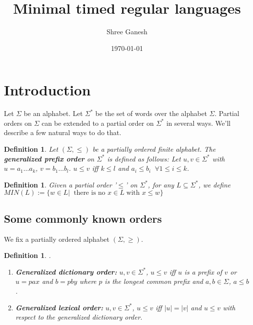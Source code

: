 \documentclass[a4paper,12pt]{article}
\title{Minimal timed regular languages}
\author{Shree Ganesh}
\date{\today}
\theoremstyle{break}
\newtheorem{definition}[theorem]{Definition}
\begin{document}
\maketitle
\titlepage
\newpage

\tableofcontents
\newpage

\section{Introduction}

Let $\Sigma$ be an alphabet. Let $\Sigma^*$ be the set of words over the alphabet $\Sigma$.
Partial orders on $\Sigma$ can be extended to a partial order on $\Sigma^*$ in several ways.
We'll describe a few natural ways to do that. 

\begin{definition}
    Let $(\Sigma,\leq)$ be a partially ordered finite alphabet. The \textbf{generalized prefix order}
    on $\Sigma^*$ is defined as follows: Let $u,v\in \Sigma^*$ with $u=a_1\dots a_k$, $v=b_1\dots b_l$.
    $u\leq v$ iff $k\leq l$ and $a_i\leq b_i\;\;\forall 1\leq i\leq k$.
\end{definition}


\begin{definition}
    Given a partial order '$\leq$' on $\Sigma^*$, for any $L\subseteq \Sigma^*$, we define $MIN(L):=
    \{w\in L|\;\; \text{there is no } x\in L\; \text{with } x\leq w\}$
\end{definition}

\subsection{Some commonly known orders}

We fix a partially ordered alphabet $(\Sigma,\geq)$.

\begin{definition}
    .
    \begin{enumerate}
        \item \textbf{Generalized dictionary order:} $u,v\in \Sigma^*$, $u\leq v$ iff $u$ is
        a prefix of $v$ or $u=pax$ and $b=pby$ where $p$ is the longest common prefix and $a,b\in\Sigma$, $a\leq b$.\\
        \item \textbf{Generalized lexical order:} $u,v\in \Sigma^*$, $u\leq v$ iff $|u|=|v|$ and $u\leq v$ with respect to the generalized dictionary order.
    \end{enumerate}
    
\end{definition}
\end{document}
